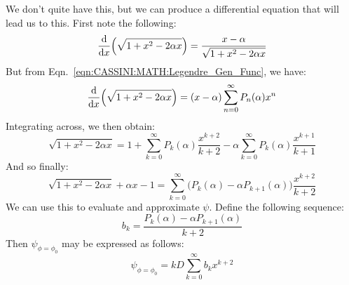             We don't quite have this, but we can
            produce a differential equation that
            will lead us to this. First note
            the following:
            \begin{equation}
                \frac{\mathop{}\!\mathrm{d}}{\mathop{}\!\mathrm{d}{x}}
                \Big(\sqrt{1+x^{2}-2\alpha{x}}\Big)
                =\frac{x-\alpha}{\sqrt{1+x^{2}-2\alpha{x}}}
            \end{equation}
            But from
            Eqn.~\ref{eqn:CASSINI:MATH:Legendre_Gen_Func}, we
            have:
            \begin{equation}
                \frac{\mathop{}\!\mathrm{d}}{\mathop{}\!\mathrm{d}{x}}
                \Big(\sqrt{1+x^{2}-2\alpha{x}}\Big)
                =(x-\alpha)
                \sum_{n=0}^{\infty}P_{n}(\alpha)x^{n}
            \end{equation}
            Integrating across, we then obtain:
            \begin{equation}
                \sqrt{1+x^{2}-2\alpha{x}}
                =1+\sum_{k=0}^{\infty}P_{k}(\alpha)
                \frac{x^{k+2}}{k+2}
                -\alpha\sum_{k=0}^{\infty}P_{k}(\alpha)
                \frac{x^{k+1}}{k+1}
            \end{equation}
            And so finally:
            \begin{equation}
                \sqrt{1+x^{2}-2\alpha{x}}+\alpha{x}-1
                =\sum_{k=0}^{\infty}
                \Big(P_{k}(\alpha)-
                     \alpha{P_{k+1}}(\alpha)\Big)
                \frac{x^{k+2}}{k+2}
            \end{equation}
            We can use this to evaluate and
            approximate $\psi$.
            Define the following sequence:
            \begin{equation}
                b_{k}=
                \frac{P_{k}(\alpha)-\alpha{P_{k+1}}(\alpha)}
                     {k+2}
            \end{equation}
            Then $\psi_{\phi=\phi_{0}}$ may be expressed
            as follows:
            \begin{equation}
                \psi_{\phi=\phi_{0}}=
                kD\sum_{k=0}^{\infty}b_{k}x^{k+2}
            \end{equation}
